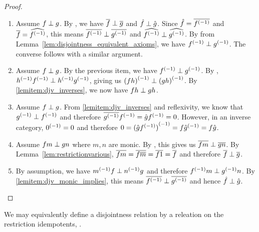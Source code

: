\begin{proof}
  \prepprooflist
  \begin{enumerate}[{(}i{)}]
    \item Assume $f \perp g$. By , we have $\overline{f} \perp \overline{g}$ and
      $\hat{f}\perp\hat{g}$. Since $\hat{f} = \overline{{f}^{(-1)}}$ and $\overline{f} = \widehat{{f}^{(-1)}}$, this
      means $\overline{{f}^{(-1)}} \perp \overline{{g}^{(-1)}}$ and $\widehat{{f}^{(-1)}}\perp\widehat{{g}^{(-1)}}$. By
       from Lemma~\ref{lem:disjointness_equivalent_axioms}, we have
      ${f}^{(-1)} \perp {g}^{(-1)}$. The converse follows with  a similar argument.
    \item Assume $f \perp g$. By the previous item, we have ${f}^{(-1)}\perp{g}^{(-1)}$. By
      , ${h}^{(-1)}{f}^{(-1)}\perp{h}^{(-1)}{g}^{(-1)}$, giving us ${(f h)}^{(-1)} \perp
      {(g h)}^{(-1)}$. By \ref{lemitem:djv_inverses}, we now have $f h \perp g h$.
    \item Assume $f \perp g$. From \ref{lemitem:djv_inverses} and reflexivity, we know that
      ${g}^{(-1)} \perp {f}^{(-1)}$ and therefore $\overline{{g}^{(-1)}}{f}^{(-1)} = \hat{g}{f}^{(-1)}= 0$. However, in
      an inverse category, ${0}^{(-1)} = 0$ and therefore $0 = {(\hat{g}{f}^{(-1)})}^{(-1)} = f {\hat{g}}^{(-1)} =
      f \hat{g}$.
    \item Assume $f m \perp g n$ where $m, n$ are monic. By , this gives us
      $\overline{f m} \perp \overline{g n}$. By Lemma~\ref{lem:restrictionvarious},
      $\overline{f m} = \overline{f \overline{m}} = \overline{f 1} = \overline{f}$ and therefore $\overline{f} \perp \overline{g}$.
    \item By assumption, we have ${m}^{(-1)} f \perp  {n}^{(-1)}g$ and therefore ${f}^{(-1)}m \perp
      {g}^{(-1)} n$. By \ref{lemitem:djv_monic_implies}, this means $\overline{{f}^{(-1)}} \perp
      \overline{{g}^{(-1)}}$ and hence $\hat{f} \perp \hat{g}$.
  \end{enumerate}
\end{proof}

We may equivalently define a disjointness relation by a releation on the restriction idempotents, .

